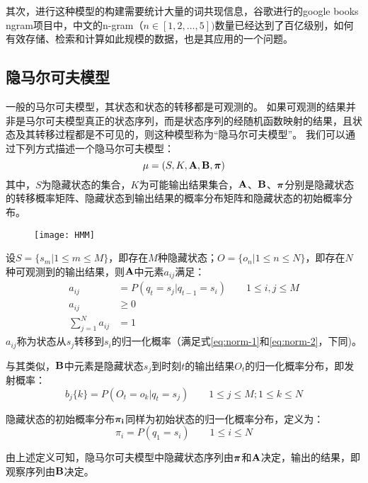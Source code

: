 其次，进行这种模型的构建需要统计大量的词共现信息，谷歌进行的google books ngram项目中，中文的n-gram（$n\in[1, 2, \dots, 5])$数量已经达到了百亿级别，如何有效存储、检索和计算如此规模的数据，也是其应用的一个问题\citep{宗成庆2013统计自然语言处理}。
\subsection{隐马尔可夫模型}
一般的马尔可夫模型，其状态和状态的转移都是可观测的。
如果可观测的结果并非是马尔可夫模型真正的状态序列，而是状态序列的经随机函数映射的结果，且状态及其转移过程都是不可见的，则这种模型称为“隐马尔可夫模型”。
我们可以通过下列方式描述一个隐马尔可夫模型：
\begin{equation}
    \mu =(S, K, \boldsymbol{\mathbf{A}}, \boldsymbol{\mathbf{B}}, \boldsymbol{\mathbf{\pi}})
\end{equation}
其中，$S$为隐藏状态的集合，$K$为可能输出结果集合，$\boldsymbol{\mathbf{A}}$、$\boldsymbol{\mathbf{B}}$、$\boldsymbol{\mathbf{\pi}}$分别是隐藏状态的转移概率矩阵、隐藏状态到输出结果的概率分布矩阵和隐藏状态的初始概率分布。
\begin{figure}[H]
    \centering
    \texttt{[image: HMM]}
    \label{fig:HMM}
\end{figure}
设$S=\{s_m|1\leq m \leq M\}$，即存在$M$种隐藏状态；$O=\{o_n|1\leq n\leq N\}$，即存在$N$种可观测到的输出结果，则$\boldsymbol{\mathbf{A}}$中元素$a_{ij}$满足：
\begin{align}
    a_{ij} &= P(q_t = s_j|q_{t-1} = s_i)\qquad 1\leq i,j \leq M\\
    a_{ij} &\geq 0 \label{eq:norm-1}\\
    \sum^{N}_{j=1}a_{ij} &= 1 \label{eq:norm-2}
\end{align}
$a_{ij}$称为状态从$s_j$转移到$s_i$的归一化概率（满足式\ref{eq:norm-1}和\ref{eq:norm-2}，下同)。

与其类似，$\boldsymbol{\mathbf{B}}$中元素是隐藏状态$s_j$到时刻$t$的输出结果$O_t$的归一化概率分布，即发射概率：
\begin{equation}
    b_j\{k\} = P(O_t = o_k |q_t = s_j)\qquad 1\leq j \leq M; 1\leq k\leq N
\end{equation}

隐藏状态的初始概率分布$\boldsymbol{\mathbf{\pi_i}}$同样为初始状态的归一化概率分布，定义为：
\begin{equation}
    \pi_i = P(q_1 = s_i)\qquad 1\leq i \leq N
\end{equation}

由上述定义可知，隐马尔可夫模型中隐藏状态序列由$\boldsymbol{\mathbf{\pi}}$和$\boldsymbol{\mathbf{A}}$决定，输出的结果，即观察序列由$\boldsymbol{\mathbf{B}}$决定。

